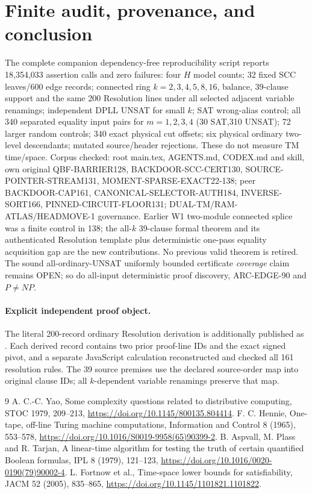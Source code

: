 \documentclass[11pt]{article}
\begin{document}
\section{Finite audit, provenance, and conclusion}
The complete companion dependency-free reproducibility script reports
18,354,033 assertion calls and zero failures: four $H$ model counts;
32 fixed SCC leaves/600 edge records; connected ring $k=2,3,4,5,8,16$,
balance, 39-clause support and the same 200 Resolution lines
under all selected adjacent variable renamings; independent DPLL
UNSAT for small $k$; SAT wrong-alias control; all 340 separated
equality input pairs for $m=1,2,3,4$ (30 SAT,310 UNSAT);
72 larger random controls; 340 exact physical cut offsets;
six physical ordinary two-level descendants; mutated source/header
rejections. These do not measure TM time/space.
Corpus checked: root main.tex, AGENTS.md, CODEX.md and skill,
own original QBF-BARRIER128, BACKDOOR-SCC-CERT130,
SOURCE-POINTER-STREAM131, MOMENT-SPARSE-EXACT22-138;
peer BACKDOOR-CAP161, CANONICAL-SELECTOR-AUTH184,
INVERSE-SORT166, PINNED-CIRCUIT-FLOOR131;
DUAL-TM/RAM-ATLAS/HEADMOVE-1 governance.
Earlier W1 two-module connected splice was a finite control in 138;
the all-$k$ 39-clause formal theorem and its authenticated Resolution
template plus deterministic one-pass equality acquisition gap are the
new contributions. No previous valid theorem is retired.
The sound all-ordinary-UNSAT uniformly bounded certificate
\emph{coverage} claim remains OPEN; so do all-input deterministic
proof discovery, ARC-EDGE-90 and $P\ne NP$.

\paragraph{Explicit independent proof object.}
The literal 200-record ordinary Resolution derivation is additionally
published as .
Each derived record contains two prior proof-line IDs and the exact signed
pivot, and a separate JavaScript calculation reconstructed and checked all
161 resolution rules. The 39 source premises use the declared source-order
map into original clause IDs; all $k$-dependent variable renamings preserve
that map.
\begin{thebibliography}{9}
 A. C.-C. Yao, Some complexity questions related to
distributive computing, STOC 1979, 209--213,
\url{https://doi.org/10.1145/800135.804414}.
 F. C. Hennie, One-tape, off-line Turing machine
computations, Information and Control 8 (1965), 553--578,
\url{https://doi.org/10.1016/S0019-9958(65)90399-2}.
 B. Aspvall, M. Plass and R. Tarjan, A linear-time
algorithm for testing the truth of certain quantified Boolean
formulas, IPL 8 (1979), 121--123,
\url{https://doi.org/10.1016/0020-0190(79)90002-4}.
 L. Fortnow et al., Time-space lower bounds for
satisfiability, JACM 52 (2005), 835--865,
\url{https://doi.org/10.1145/1101821.1101822}.
\end{thebibliography}
\end{document}
